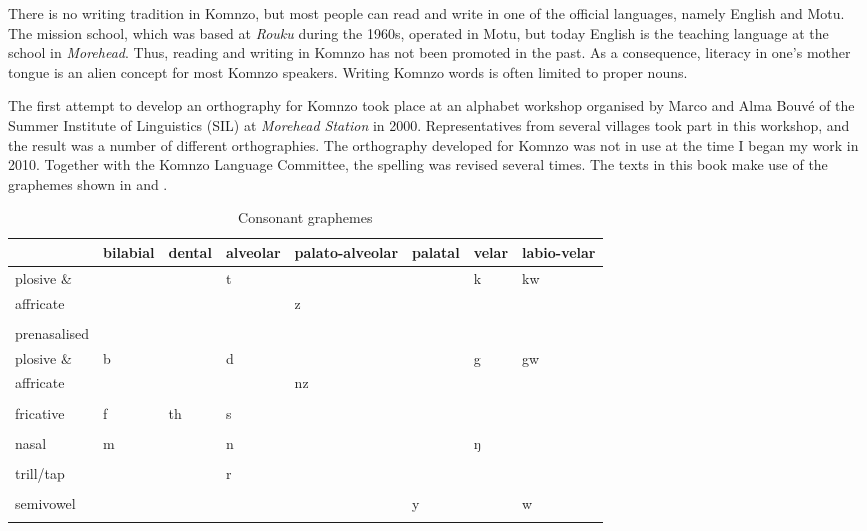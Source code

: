 There is no writing tradition in Komnzo, but most people can read and write in one of the official languages, namely English and Motu. The mission school, which was based at \textit{Rouku} during the 1960s, operated in Motu, but today English is the teaching language at the school in \textit{Morehead}. Thus, reading and writing in Komnzo has not been promoted in the past. As a consequence, literacy in one's mother tongue is an alien concept for most Komnzo speakers. Writing Komnzo words is often limited to proper nouns.

The first attempt to develop an orthography for Komnzo took place at an alphabet workshop organised by Marco and Alma Bouvé of the Summer Institute of Linguistics (SIL) at \textit{Morehead Station} in 2000. Representatives from several villages took part in this workshop, and the result was a number of different orthographies. The orthography developed for Komnzo was not in use at the time I began my work in 2010. Together with the Komnzo Language Committee, the spelling was revised several times. The texts in this book make use of the graphemes shown in  and . 

\begin{table}[h]
\caption{Consonant graphemes}
\label{orthogcons}\small
	\begin{tabularx}{\textwidth}{p{2cm}XXXXXXX}
		\lsptoprule
		& {bilabial}& {dental} & {alveolar} & {palato-alveolar}	& {palatal} & {velar} & {labio-velar} \\ \midrule
		{plosive} \&&&&t&&&k&kw\\
		{affricate}&&&&z&&&\\
		&&&&&&&\\
		{prenasalised} &&&&&&&\\
		{plosive \&}&b&&d&&&g&gw\\
        {affricate} &&&&nz&&&\\
        &&&&&&&\\
		{fricative} & f	& th & s &&&&\\
		&&&&&&&\\
		{nasal} & m && n &&& ŋ & \\
		&&&&&&&\\
		{trill/tap} &&& r &&&&\\
		&&&&&&&\\
		{semivowel} &&&&&y && w\\
		\lspbottomrule
	\end{tabularx}
\end{table}%

